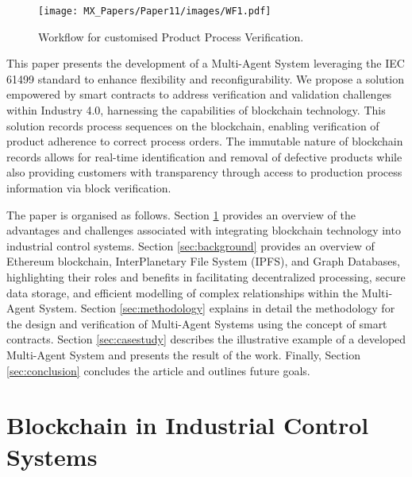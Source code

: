 \begin{bibunit}
\begin{figure*}
    \texttt{[image: MX\_Papers/Paper11/images/WF1.pdf]}
    \caption{Workflow for customised Product Process Verification.}
    \label{fig:workflow_diagram}
\end{figure*}


This paper presents the development of a Multi-Agent System leveraging the IEC 61499 standard to enhance flexibility and reconfigurability. We propose a solution empowered by smart contracts to address verification and validation challenges within Industry 4.0, harnessing the capabilities of blockchain technology. This solution records process sequences on the blockchain, enabling verification of product adherence to correct process orders. The immutable nature of blockchain records allows for real-time identification and removal of defective products while also providing customers with transparency through access to production process information via block verification.


The paper is organised as follows. Section \ref{sec:Blockchain in ICS} provides an overview of the advantages and challenges associated with integrating blockchain technology into industrial control systems. Section \ref{sec:background} provides an overview of Ethereum blockchain, InterPlanetary File System (IPFS), and Graph Databases, highlighting their roles and benefits in facilitating decentralized processing, secure data storage, and efficient modelling of complex relationships within the Multi-Agent System. Section \ref{sec:methodology} explains in detail the methodology for the design and verification of Multi-Agent Systems using the concept of smart contracts. Section \ref{sec:casestudy}  describes the illustrative example of a developed Multi-Agent System and presents the result of the work. Finally, Section \ref{sec:conclusion} concludes the article and outlines future goals.



\section{Blockchain in Industrial Control Systems}
\label{sec:Blockchain in ICS}


\end{bibunit}
